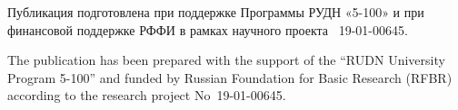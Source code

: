 
\begin{Russian}
Публикация подготовлена при поддержке Программы РУДН «5-100»
и при финансовой поддержке РФФИ в рамках научного проекта
\textnumero~19-01-00645.

\end{Russian}
\begin{English}
The publication has been prepared with the support of the ``RUDN University Program 5-100''
and funded by Russian Foundation for Basic Research (RFBR) according to the research project
No~19-01-00645.

\end{English}


